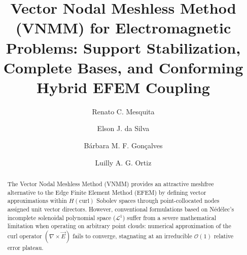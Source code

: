 \documentclass[preprint,12pt]{elsarticle}
\begin{document}
\begin{frontmatter}



\title{Vector Nodal Meshless Method (VNMM) for Electromagnetic Problems: Support Stabilization, Complete Bases, and Conforming Hybrid EFEM Coupling}



\author[ufmg]{Renato C. Mesquita}
\author[ufmg]{Elson J. da Silva}
\author[ufmg]{Bárbara M. F. Gonçalves}
\author[ufmg]{Luilly A. G. Ortiz}



\begin{abstract}
The Vector Nodal Meshless Method (VNMM) provides an attractive meshfree alternative to the Edge Finite Element Method (EFEM) by defining vector approximations within $H(\mathrm{curl})$ Sobolev spaces through point-collocated nodes assigned unit vector directors. However, conventional formulations based on Nédélec's incomplete solenoidal polynomial space ($\mathcal{L}^1$) suffer from a severe mathematical limitation when operating on arbitrary point clouds: numerical approximation of the curl operator $(\nabla \times \vec{E})$ fails to converge, stagnating at an irreducible $\mathcal{O}(1)$ relative error plateau. 


\end{abstract}
\end{frontmatter}
\end{document}
